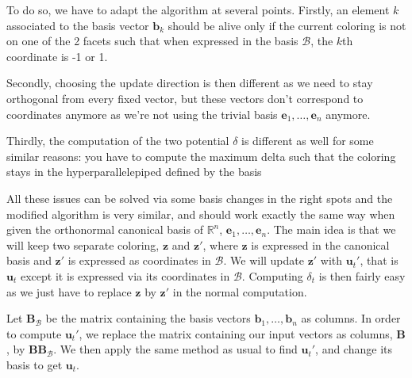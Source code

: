 \documentclass[12pt]{article}
\begin{document}
To do so, we have to adapt the algorithm at several points. Firstly, an element $k$ associated to the basis vector $\textbf{b}_k$ should be alive only if the current coloring is not on one of the 2 facets such that when expressed in the basis $\mathcal{B}$, the $k$th coordinate is -1 or 1. 

Secondly, choosing the update direction is then different as we need to stay orthogonal from every fixed vector, but these vectors don't correspond to coordinates anymore as we're not using the trivial basis $\textbf{e}_1,\dots,\textbf{e}_n$ anymore.

Thirdly, the computation of the two potential $\delta$ is different as well for some similar reasons: you have to compute the maximum delta such that the coloring stays in the hyperparallelepiped defined by the basis

All these issues can be solved via some basis changes in the right spots and the modified algorithm is very similar, and should work exactly the same way when given the orthonormal canonical basis of $\mathbb{R}^n$, $\textbf{e}_1,\dots,\textbf{e}_n$. The main idea is that we will keep two separate coloring, $\textbf{z}$ and $\textbf{z}'$, where $\textbf{z}$ is expressed in the canonical basis and $\textbf{z}'$ is expressed as coordinates in $\mathcal{B}$. We will update $\textbf{z}'$ with $\textbf{u}_t'$, that is $\textbf{u}_t$ except it is expressed via its coordinates in $\mathcal{B}$. Computing $\delta_t$ is then fairly easy as we just have to replace $\textbf{z}$ by $\textbf{z}'$ in the normal computation. 

Let $\textbf{B}_{\mathcal{B}}$ be the matrix containing the basis vectors $\textbf{b}_1,\dots,\textbf{b}_n$ as columns. In order to compute $\textbf{u}_t'$, we replace the matrix containing our input vectors as columns, $\textbf{B}$, by $\textbf{B}\textbf{B}_{\mathcal{B}}$. We then apply the same method as usual to find $\textbf{u}_t'$, and change its basis to get $\textbf{u}_t$.
\end{document}
